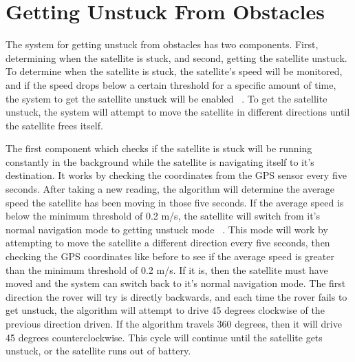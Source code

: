 \documentclass[10pt,letterpaper,onecolumn,journal]{IEEEtran}
\begin{document}
\section{Getting Unstuck From Obstacles}
The system for getting unstuck from obstacles has two components. First, determining when the satellite is stuck, and second, getting the satellite unstuck. To determine when the satellite is stuck, the satellite’s speed will be monitored, and if the speed drops below a certain threshold for a specific amount of time, the system to get the satellite unstuck will be enabled ~\cite{herbach}. To get the satellite unstuck, the system will attempt to move the satellite in different directions until the satellite frees itself.\vspace{.3cm}
\par
The first component which checks if the satellite is stuck will be running constantly in the background while the satellite is navigating itself to it’s destination. It works by checking the coordinates from the GPS sensor every five seconds. After taking a new reading, the algorithm will determine the average speed the satellite has been moving in those five seconds. If the average speed is below the minimum threshold of 0.2 m/s, the satellite will switch from it’s normal navigation mode to getting unstuck mode ~\cite{herbach}. This mode will work by attempting to move the satellite a different direction every five seconds, then checking the GPS coordinates like before to see if the average speed is greater than the minimum threshold of 0.2 m/s. If it is, then the satellite must have moved and the system can switch back to it’s normal navigation mode. The first direction the rover will try is directly backwards, and each time the rover fails to get unstuck, the algorithm will attempt to drive 45 degrees clockwise of the previous direction driven. If the algorithm travels 360 degrees, then it will drive 45 degrees counterclockwise. This cycle will continue until the satellite gets unstuck, or the satellite runs out of battery.\vspace{.3cm}
\par
\end{document}
